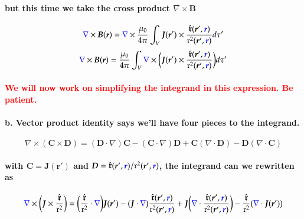 \documentclass{article}
\begin{document}
\paragraph{but this time we take the cross product $\nabla\times\boldsymbol{B}$}
\begin{equation*}
    \textcolor{blue}{\nabla}\times\boldsymbol{B}(\boldsymbol{r})=\textcolor{blue}{\nabla}\times\frac{\mu_0}{4\pi}\int_V \boldsymbol{J}(\boldsymbol{r}')\times\frac{\hat{\boldsymbol{\mathfrak{r}}}(\boldsymbol{r}',\textcolor{blue}{\boldsymbol{r}})}{\mathfrak{r}^2(\boldsymbol{r}',\textcolor{blue}{\boldsymbol{r}})}d\tau'
\end{equation*}
\begin{equation*}
    \textcolor{blue}{\nabla}\times\boldsymbol{B}(\boldsymbol{r})=\frac{\mu_0}{4\pi}\int_V\textcolor{blue}{\nabla}\times\bigg(\boldsymbol{J}(\boldsymbol{r}')\times\frac{\hat{\boldsymbol{\mathfrak{r}}}(\boldsymbol{r}',\textcolor{blue}{\boldsymbol{r}})}{\mathfrak{r}^2(\boldsymbol{r}',\textcolor{blue}{\boldsymbol{r}})}\bigg) d\tau'
\end{equation*}
\paragraph{\textcolor{red}{We will now work on simplifying the integrand in this expression. Be patient.}}
\paragraph{\indent b. Vector product identity says we'll have four pieces to the integrand.}
\begin{equation*}
    \nabla\times(\boldsymbol{C}\times\boldsymbol{D})=(\boldsymbol{D}\cdot\nabla)\boldsymbol{C}-(\boldsymbol{C}\cdot\nabla)\boldsymbol{D}+\boldsymbol{C}(\nabla\cdot\boldsymbol{D})-\boldsymbol{D}(\nabla\cdot\boldsymbol{C})
\end{equation*}
\paragraph{with $\boldsymbol{C}=\boldsymbol{J}(\boldsymbol{r}')$ and $\boldsymbol{D}=\hat{\boldsymbol{\mathfrak{r}}}(\boldsymbol{r}',\textcolor{blue}{\boldsymbol{r}})/\mathfrak{r}^2(\boldsymbol{r}',\textcolor{blue}{\boldsymbol{r}})$, the integrand can we rewritten as}
\begin{equation*}
    \textcolor{blue}{\nabla}\times\bigg(\boldsymbol{J}\times\frac{\hat{\boldsymbol{\mathfrak{r}}}}{\mathfrak{r}^2}\bigg)=\bigg(\frac{\hat{\boldsymbol{\mathfrak{r}}}}{\mathfrak{r}^2}\cdot\textcolor{blue}{\nabla}\bigg)\boldsymbol{J}(\boldsymbol{r}')-(\boldsymbol{J}\cdot\textcolor{blue}{\nabla})\frac{\hat{\boldsymbol{\mathfrak{r}}}(\boldsymbol{r}',\textcolor{blue}{\boldsymbol{r}})}{\mathfrak{r}^2(\boldsymbol{r}',\textcolor{blue}{\boldsymbol{r}})}+\boldsymbol{J}\bigg(\textcolor{blue}{\nabla}\cdot\frac{\hat{\boldsymbol{\mathfrak{r}}}(\boldsymbol{r}',\textcolor{blue}{\boldsymbol{r}})}{\mathfrak{r}^2(\boldsymbol{r}',\textcolor{blue}{\boldsymbol{r}})}\bigg)-\frac{\hat{\boldsymbol{\mathfrak{r}}}}{\mathfrak{r}^2}(\textcolor{blue}{\nabla}\cdot\boldsymbol{J}(\boldsymbol{r}'))
\end{equation*}
\end{document}
